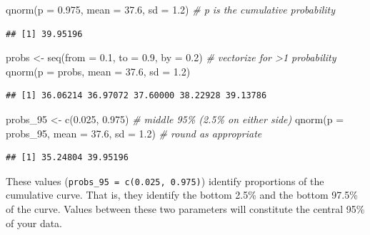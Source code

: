 \documentclass[
  11pt,
  a4paper,
]{book}
\newenvironment{Shaded}{\begin{snugshade}}{\end{snugshade}}
\newcommand{\AttributeTok}[1]{\textcolor[rgb]{0.77,0.63,0.00}{#1}}
\newcommand{\CommentTok}[1]{\textcolor[rgb]{0.56,0.35,0.01}{\textit{#1}}}
\newcommand{\FloatTok}[1]{\textcolor[rgb]{0.00,0.00,0.81}{#1}}
\newcommand{\FunctionTok}[1]{\textcolor[rgb]{0.00,0.00,0.00}{#1}}
\newcommand{\NormalTok}[1]{#1}
\newcommand{\OtherTok}[1]{\textcolor[rgb]{0.56,0.35,0.01}{#1}}
\begin{document}
\begin{Shaded}
\begin{Highlighting}[]
\FunctionTok{qnorm}\NormalTok{(}\AttributeTok{p =} \FloatTok{0.975}\NormalTok{, }\AttributeTok{mean =} \FloatTok{37.6}\NormalTok{, }\AttributeTok{sd =} \FloatTok{1.2}\NormalTok{) }\CommentTok{\# p is the cumulative probability }
\end{Highlighting}
\end{Shaded}

\begin{verbatim}
## [1] 39.95196
\end{verbatim}

\begin{Shaded}
\begin{Highlighting}[]
\NormalTok{probs }\OtherTok{\textless{}{-}} \FunctionTok{seq}\NormalTok{(}\AttributeTok{from =} \FloatTok{0.1}\NormalTok{, }\AttributeTok{to =} \FloatTok{0.9}\NormalTok{, }\AttributeTok{by =} \FloatTok{0.2}\NormalTok{) }\CommentTok{\# vectorize for \textgreater{}1 probability}
\FunctionTok{qnorm}\NormalTok{(}\AttributeTok{p =}\NormalTok{ probs, }\AttributeTok{mean =} \FloatTok{37.6}\NormalTok{, }\AttributeTok{sd =} \FloatTok{1.2}\NormalTok{) }
\end{Highlighting}
\end{Shaded}

\begin{verbatim}
## [1] 36.06214 36.97072 37.60000 38.22928 39.13786
\end{verbatim}

\begin{Shaded}
\begin{Highlighting}[]
\NormalTok{probs\_95 }\OtherTok{\textless{}{-}} \FunctionTok{c}\NormalTok{(}\FloatTok{0.025}\NormalTok{, }\FloatTok{0.975}\NormalTok{) }\CommentTok{\# middle 95\% (2.5\% on either side)}
\FunctionTok{qnorm}\NormalTok{(}\AttributeTok{p =}\NormalTok{ probs\_95, }\AttributeTok{mean =} \FloatTok{37.6}\NormalTok{, }\AttributeTok{sd =} \FloatTok{1.2}\NormalTok{) }\CommentTok{\# round as appropriate}
\end{Highlighting}
\end{Shaded}

\begin{verbatim}
## [1] 35.24804 39.95196
\end{verbatim}

These values (\texttt{probs\_95\ =\ c(0.025,\ 0.975)}) identify proportions of the cumulative curve. That is, they identify the bottom 2.5\% and the bottom 97.5\% of the curve. Values between these two parameters will constitute the central 95\% of your data.
\end{document}
